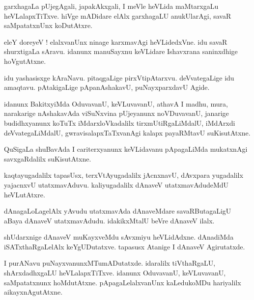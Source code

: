 \documentclass{article}
\begin{document}
\begin{mng}%
garxhagaLa pUjegAgali, japakAkxgali, I meVle heVLida maMtarxgaLu heVLalapxTiTxve. hiVge mADidare 
elAlx garxhagaLU anukUlarAgi, savaR  saMpatatxnUnx koDutAtxre.
\end{mng}

\begin{mng}%
eleY doreyeV ! elalxvanUnx ninage karxmavAgi heVLidedxVne. idu savaR shurxtigaLa sAravu. idanunx 
manuSayxnu keVLidare Ishavxrana saninxdhige hoVgutAtxne.
\end{mng}

\begin{mng}%
idu yashasisxge kAraNavu. pitaqgaLige pirxVtipAtarxvu. deVvategaLige idu amaqtavu. pAtakigaLige 
pApanAshakavU, puNayxparxdavU Agide.
\end{mng}

\begin{mng}%
idanunx BakitxyiMda OduvavanU, keVLuvavanU, athavA I madhu, mura, narakarige nAshakavAda 
viSuNxvina pUjeyanunx noVDuvavanU, janarige budidhxyanunx koTuTx iMdarxloVkadalilx 
tirxmUtiRgaLiMdalU, iMdArxdi deVvategaLiMdalU, gwravisalapxTaTxvanAgi kalapx payaRMtavU 
suKisutAtxne.
\end{mng}

\begin{mng}%
QuSigaLa shuBavAda I cariterxyanunx keVLidavanu pApagaLiMda mukatxnAgi savxgaRdalilx suKisutAtxne.
\end{mng}

\begin{mng}%
kaqtayugadalilx tapasUsx, terxVtAyugadalilx jAcnxnavU, dAvxpara yugadalilx yajacnxvU 
utatxmavAduvu. kaliyugadalilx dAnaveV utatxmavAdudeMdU heVLutAtxre.
\end{mng}

\begin{mng}%
dAnagaLoLagelAlx yAvudu utatxmavAda dAnaveMdare savaRButagaLigU aBaya dAnaveV utatxmavAdudu. 
idakikxMtalU beVre dAnaveV ilalx.
\end{mng}

\begin{mng}%
shUdarxnige dAnaveV muKayxveMdu sAvxmiyu heVLidAdxne. dAnadiMda iSATxthaRgaLelAlx keYgUDutatxve. 
tapasusx Atanige I dAnaveV Agirutatxde.
\end{mng}

\begin{mng}%
I purANavu puNayxvanunxMTumADutatxde. idaralilx tiVthaRgaLU, shArxdadhxgaLU heVLalapxTiTxve. 
idanunx OduvavanU, keVLuvavanU, saMpatatxnunx hoMdutAtxne. pApagaLelalxvanUnx kaLedukoMDu 
hariyalilx aikayxnAgutAtxne.
\end{mng}
\end{document}

